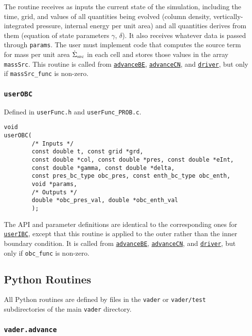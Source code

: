 \documentclass[12pt]{article}
\begin{document}
The routine receives as inputs the current state of the simulation, including the time, grid, and values of all quantities being evolved (column density, vertically-integrated pressure, internal energy per unit area) and all quantities derives from them (equation of state parameters $\gamma$, $\delta$). It also receives whatever data is passed through \verb=params=. The user must implement code that computes the source term for mass per unit area $\dot{\Sigma}_{\rm src}$ in each cell and stores those values in the array \verb=massSrc=. This routine is called from \hyperref[sssec:advanceBE]{\texttt{advanceBE}}, \hyperref[sssec:advanceCN]{\texttt{advanceCN}}, and \hyperref[sssec:driver]{\texttt{driver}}, but only if \verb=massSrc_func= is non-zero.

\subsubsection{\texttt{userOBC}}
\label{sssec:userOBC}

Defined in \verb=userFunc.h= and \verb=userFunc_PROB.c=.

\begin{verbatim}
void
userOBC(
        /* Inputs */
        const double t, const grid *grd,
        const double *col, const double *pres, const double *eInt,
        const double *gamma, const double *delta,
        const pres_bc_type obc_pres, const enth_bc_type obc_enth,
        void *params, 
        /* Outputs */
        double *obc_pres_val, double *obc_enth_val
        );
\end{verbatim}

The API and parameter definitions are identical to the corresponding ones for \hyperref[sssec:userIBC]{\texttt{userIBC}}, except that this routine is applied to the outer rather than the inner boundary condition. It is called from \hyperref[sssec:advanceBE]{\texttt{advanceBE}}, \hyperref[sssec:advanceCN]{\texttt{advanceCN}}, and \hyperref[sssec:driver]{\texttt{driver}}, but only if \verb=obc_func= is non-zero.


\subsection{Python Routines}
\label{ssec:pythonAPI}

All Python routines are defined by files in the \verb=vader= or \verb=vader/test= subdirectories of the main \verb=vader= directory.

\subsubsection{\texttt{vader.advance}}
\label{sssec:vader.advance}
\end{document}
